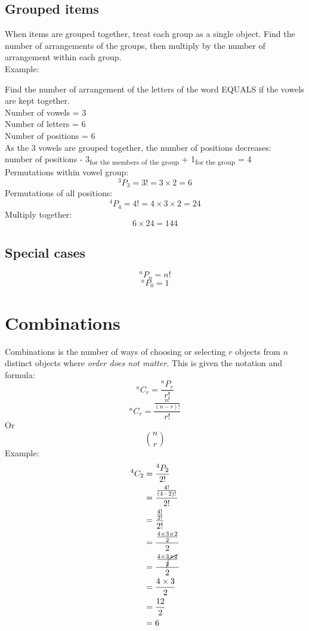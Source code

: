 \documentclass{report}
\begin{document}
\subsection{Grouped items}
When items are grouped together, treat each group as a single object.  Find the number of arrangements of the groups, then multiply by the number of arrangement within each group.\\
Example:\\
\begin{center}
	Find the number of arrangement of the letters of the word EQUALS if the vowels are kept together.\\
	Number of vowels = 3\\
	Number of letters = 6\\
	Number of positions = 6\\
	As the 3 vowels are grouped together, the number of positions decreases:\\ number of positions - 3\textsubscript{for the members of the group} + 1\textsubscript{for the group} = 4\\
	Permutations within vowel group:
	$$^3P_3 = 3! = 3 \times 2 = 6$$
	Permutations of all positions:
	$$^4P_4 = 4! = 4 \times 3 \times 2 = 24$$
	Multiply together:
	$$6 \times 24 = 144$$
\end{center}

\subsection{Special cases}
$$^nP_n = n!$$
$$^nP_0 = 1$$

\section{Combinations}
Combinations is the number of ways of choosing or selecting $r$ objects from $n$ distinct objects where \emph{order does not matter}.  This is given the notation and formula:
$$^nC_r = \frac{^nP_r}{r!}$$
$$^nC_r = \frac{\frac{n!}{(n-r)!}}{r!}$$
Or
$$
	\binom{n}{r}
$$
Example:\\
\begin{align*}
	^4C_2 & = \frac{^4P_2}{2!}                                          \\
	      & = \frac{\frac{4!}{(4 - 2)!}}{2!}                            \\
	      & = \frac{\frac{4!}{2!}}{2!}                                  \\
	      & = \frac{\frac{4 \times 3 \times 2}{2}}{2}                   \\
	      & = \frac{\frac{4 \times 3 \cancel{\times 2}}{\cancel{2}}}{2} \\
	      & = \frac{4 \times 3}{2}                                      \\
	      & = \frac{12}{2}                                              \\
	      & = 6                                                         \\
\end{align*}
\end{document}
